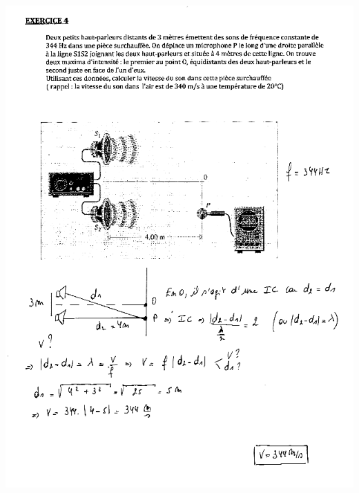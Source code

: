 \includegraphics[width=18.253cm,height=25.273cm]{Pictures/100000010000027000000360FFD6C2C9381DA208.png}

